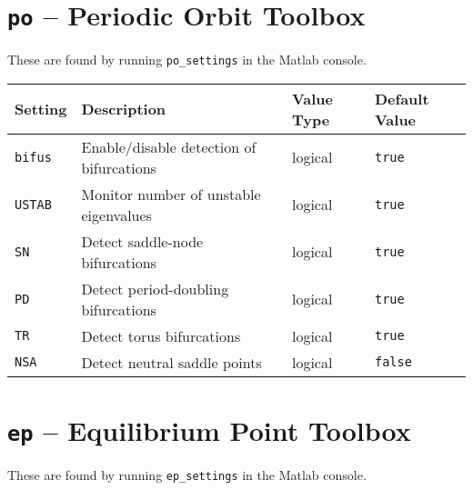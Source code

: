 \documentclass[11pt]{article}
\begin{document}
\clearpage
\section*{\texttt{po} -- Periodic Orbit Toolbox}

These are found by running \verb!po_settings! in the Matlab console.

\begin{table}[h]
  \centering
  \begin{tabular}{l|l|l|l}
    \textbf{Setting} & \textbf{Description}                     & \textbf{Value Type} & \textbf{Default Value} \\[1ex] \hline
    \verb!bifus!     & Enable/disable detection of bifurcations & logical             & \verb!true!            \\[1ex]
    \verb!USTAB!     & Monitor number of unstable  eigenvalues  & logical             & \verb!true!            \\[1ex]
    \verb!SN!        & Detect saddle-node bifurcations          & logical             & \verb!true!            \\[1ex]
    \verb!PD!        & Detect period-doubling bifurcations      & logical             & \verb!true!            \\[1ex]
    \verb!TR!        & Detect torus bifurcations                & logical             & \verb!true!            \\[1ex]
    \verb!NSA!       & Detect neutral saddle points             & logical             & \verb!false!           
  \end{tabular}
\end{table}

\section*{\texttt{ep} -- Equilibrium Point Toolbox}

These are found by running \verb!ep_settings! in the Matlab console.
\end{document}
